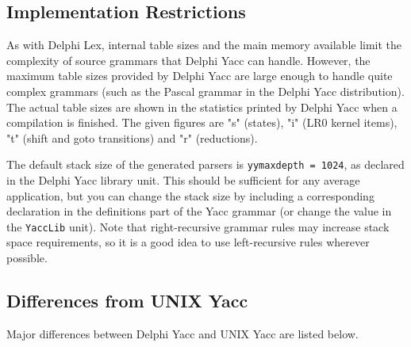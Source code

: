 \documentclass[a4paper]{article}
\begin{document}
\subsection{Implementation Restrictions}

As with Delphi Lex, internal table sizes and the main memory available limit the
complexity of source grammars that Delphi Yacc can handle. However, the maximum
table sizes provided by Delphi Yacc are large enough to handle quite complex
grammars (such as the Pascal grammar in the Delphi Yacc distribution). The actual
table sizes are shown in the statistics printed by Delphi Yacc when a compilation
is finished. The given figures are "s" (states), "i" (LR0 kernel items), "t"
(shift and goto transitions) and "r" (reductions).

The default stack size of the generated parsers is \verb"yymaxdepth = 1024",
as declared in the Delphi Yacc library unit. This should be sufficient for any
average application, but you can change the stack size by including a
corresponding declaration in the definitions part of the Yacc grammar
(or change the value in the \verb"YaccLib" unit). Note that right-recursive
grammar rules may increase stack space requirements, so it is a good
idea to use left-recursive rules wherever possible.

\subsection{Differences from UNIX Yacc}

Major differences between Delphi Yacc and UNIX Yacc are listed below.
\end{document}
